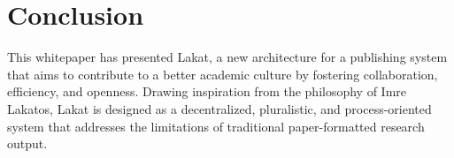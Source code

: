 \section{Conclusion}
\label{sc:conclusion}


This whitepaper has presented Lakat, a new architecture for a publishing system that aims to contribute to a better academic culture by fostering collaboration, efficiency, and openness. Drawing inspiration from the philosophy of Imre Lakatos, Lakat is designed as a decentralized, pluralistic, and process-oriented system that addresses the limitations of traditional paper-formatted research output.



